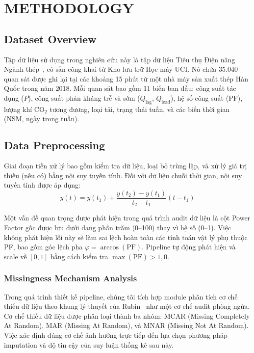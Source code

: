 \section{METHODOLOGY}
\label{sec:methodology}

\subsection{Dataset Overview}

Tập dữ liệu sử dụng trong nghiên cứu này là tập dữ liệu Tiêu thụ Điện năng Ngành thép~\cite{uci2023}, có sẵn công khai từ Kho lưu trữ Học máy UCI.
Nó chứa 35.040 quan sát được ghi lại tại các khoảng 15 phút từ một nhà máy sản xuất thép Hàn Quốc trong năm 2018.
Mỗi quan sát bao gồm 11 biến ban đầu: công suất tác dụng ($P$), công suất phản kháng trễ và sớm ($Q_{\text{lag}}$, $Q_{\text{lead}}$), hệ số công suất (PF), lượng khí CO$_2$ tương đương, loại tải, trạng thái tuần, và các biến thời gian (NSM, ngày trong tuần).

\subsection{Data Preprocessing}

Giai đoạn tiền xử lý bao gồm kiểm tra dữ liệu, loại bỏ trùng lặp, và xử lý giá trị thiếu (nếu có) bằng nội suy tuyến tính.
Đối với dữ liệu chuỗi thời gian, nội suy tuyến tính được áp dụng:
\begin{equation}
y(t) = y(t_1) + \frac{y(t_2) - y(t_1)}{t_2 - t_1}(t - t_1)
\label{eq:interp}
\end{equation}

Một vấn đề quan trọng được phát hiện trong quá trình audit dữ liệu là cột Power Factor gốc được lưu dưới dạng phần trăm (0--100) thay vì hệ số (0--1).
Việc không phát hiện lỗi này sẽ làm sai lệch hoàn toàn các tính toán vật lý phụ thuộc PF, bao gồm góc lệch pha $\varphi = \arccos(\text{PF})$.
Pipeline tự động phát hiện và scale về $[0,1]$ bằng cách kiểm tra $\max(\text{PF}) > 1{,}0$.

\subsubsection{Missingness Mechanism Analysis}

Trong quá trình thiết kế pipeline, chúng tôi tích hợp module phân tích cơ chế thiếu dữ liệu theo khung lý thuyết của Rubin~\cite{rubin1976} như một cơ chế audit phòng ngừa.
Cơ chế thiếu dữ liệu được phân loại thành ba nhóm: MCAR (Missing Completely At Random), MAR (Missing At Random), và MNAR (Missing Not At Random).
Việc xác định đúng cơ chế ảnh hưởng trực tiếp đến lựa chọn phương pháp imputation và độ tin cậy của suy luận thống kê sau này.

